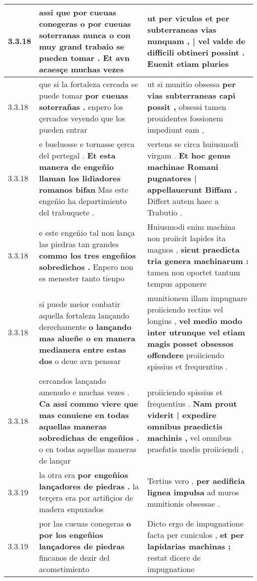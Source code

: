 \begin{tabular}{|p{1cm}|p{6.5cm}|p{6.5cm}|}
3.3.18 & assi que por cueuas conegeras \textbf{ o por cueuas soterranas nunca o con muy grand trabaio se pueden tomar . } Et avn acaesçe muchas vezes & ut per viculos \textbf{ et per subterraneas vias nunquam , | vel valde de difficili obtineri possint . } Euenit etiam pluries \\\hline
3.3.18 & que si la fortaleza cercada se puede tomar \textbf{ por cueuas soterrañas . } enpero los çercados veyendo que los pueden entrar & ut si munitio obsessa \textbf{ per vias subterraneas capi possit , } obsessi tamen prouidentes fossionem impediunt eam , \\\hline
3.3.18 & e bueluesse e tornasse çerca del pertegal . \textbf{ Et esta manera de engeñio llaman los lidiadores romanos bifan } Mas este engeñio ha departimiento del trabuquete . & vertens se circa huiusmodi virgam . \textbf{ Et hoc genus machinae Romani pugnatores | appellauerunt Biffam . } Differt autem haec a Trabutio . \\\hline
3.3.18 & e este engeñio tal non lança las piedras tan grandes \textbf{ commo los tres engeñios sobredichos . } Enpero non es menester tanto tienpo & Huiusmodi enim machina non proiicit lapides ita magnos , \textbf{ sicut praedicta tria genera machinarum : } tamen non oportet tantum tempus apponere \\\hline
3.3.18 & si puede meior conbatir aquella fortaleza lançando derechamente \textbf{ o lançando mas alueñe o en manera medianera entre estas dos } o deue avn penssar & munitionem illam impugnare proiiciendo rectius vel longius , \textbf{ vel medio modo inter utrunque vel etiam magis posset obsessos offendere } proiiciendo spissius et frequentius . \\\hline
3.3.18 & cercandos lançando amenudo e muchas vezes . \textbf{ Ca assi commo viere que mas conuiene en todas aquellas maneras sobredichas de engeñios . } o en todas aquellas maneras de lançar & proiiciendo spissius et frequentius . \textbf{ Nam prout viderit | expedire omnibus praedictis machinis , } vel omnibus praefatis modis proiiciendi , \\\hline
3.3.19 & la otra era \textbf{ por engeñios lançadores de piedras . } la terçera era por artifiçios de madera enpuxados & Tertius vero , \textbf{ per aedificia lignea impulsa } ad muros munitionis obsessae . \\\hline
3.3.19 & por las cueuas conegeras \textbf{ o por los engeñios lançadores de piedras } fincanos de dezir del acometimiento & Dicto ergo de impugnatione facta per cuniculos , \textbf{ et per lapidarias machinas ; } restat dicere de impugnatione \\\hline

\end{tabular}
